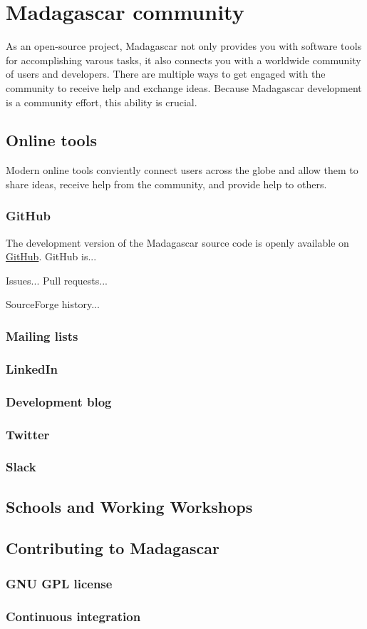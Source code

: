 \chapter{Madagascar community}

As an open-source project, Madagascar not only provides you with
software tools for accomplishing varous tasks, it also connects you
with a worldwide community of users and developers. There are multiple
ways to get engaged with the community to receive help and exchange
ideas. Because Madagascar development is a community effort, this
ability is crucial.

\section{Online tools}

Modern online tools conviently connect users across the globe and
allow them to share ideas, receive help from the community, and
provide help to others. 

\subsection{GitHub}

The development version of the Madagascar source code is openly available on \href{https://github.com}{GitHub}. GitHub is...

Issues... Pull requests...

SourceForge history...

\subsection{Mailing lists}

\subsection{LinkedIn}

\subsection{Development blog}

\subsection{Twitter}

\subsection{Slack}

\section{Schools and Working Workshops}

\section{Contributing to Madagascar}

\subsection{GNU GPL license}

\subsection{Continuous integration}
